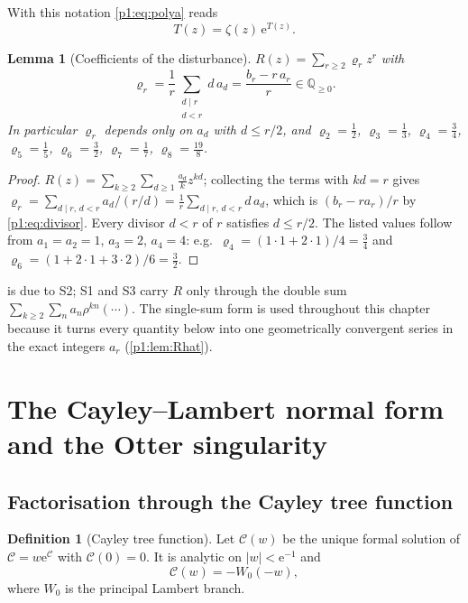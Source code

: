 \documentclass[11pt,a4paper,oneside]{book}
\theoremstyle{plain}
\newtheorem{lemma}[theorem]{Lemma}
\theoremstyle{definition}
\newtheorem{definition}[theorem]{Definition}
\theoremstyle{remark}
\newcommand{\Rat}{\mathbb{Q}}
\newcommand{\e}{\mathrm{e}}
\newcommand{\Wlam}{W}
\begin{document}
With this notation \cref{p1:eq:polya} reads
\begin{equation}
 T(z)=\zeta(z)\,\e^{T(z)} .
 \label{p1:eq:T-zeta}
\end{equation}

\begin{lemma}[Coefficients of the disturbance]
\label{p1:lem:R-coefficients}
$R(z)=\sum_{r\ge2}\varrho_rz^r$ with
\begin{equation}
 \varrho_r=\frac1r\sum_{\substack{d\mid r\\ d<r}}d\,a_d
 =\frac{b_r-r\,a_r}{r}\in\Rat_{\ge0}.
 \label{p1:eq:varrho}
\end{equation}
In particular $\varrho_r$ depends only on $a_d$ with $d\le r/2$, and $\varrho_2=\tfrac12$,
$\varrho_3=\tfrac13$, $\varrho_4=\tfrac34$, $\varrho_5=\tfrac15$, $\varrho_6=\tfrac32$,
$\varrho_7=\tfrac17$, $\varrho_8=\tfrac{19}{8}$.
\end{lemma}

\begin{proof}
$R(z)=\sum_{k\ge2}\sum_{d\ge1}\frac{a_d}{k}z^{kd}$; collecting the terms with $kd=r$ gives
$\varrho_r=\sum_{d\mid r,\,d<r}a_d/(r/d)=\frac1r\sum_{d\mid r,\,d<r}d\,a_d$, which is
$\left(b_r-ra_r\right)/r$ by \cref{p1:eq:divisor}. Every divisor $d<r$ of $r$ satisfies $d\le
r/2$.  The listed values follow from $a_1=a_2=1$, $a_3=2$, $a_4=4$: e.g.\
$\varrho_4=(1\cdot1+2\cdot1)/4=\tfrac34$ and $\varrho_6=(1+2\cdot1+3\cdot2)/6=\tfrac32$.
\end{proof}

 is due to \textsf{S2}; \textsf{S1} and \textsf{S3} carry $R$ only
through the double sum $\sum_{k\ge2}\sum_na_n\rho^{kn}(\cdots)$. The single-sum form is used
throughout this chapter because it turns every quantity below into one geometrically
convergent series in the exact integers $a_r$ (\cref{p1:lem:Rhat}).

\section{The Cayley--Lambert normal form and the Otter singularity}
\label{p1:sec:dominant}

\subsection{Factorisation through the Cayley tree function}

\begin{definition}[Cayley tree function]
\label{p1:def:cayley}
Let $\mathcal C(w)$ be the unique formal solution of $\mathcal C=w\e^{\mathcal C}$ with
$\mathcal C(0)=0$.  It is analytic on $|w|<\e^{-1}$ and
\begin{equation}
 \mathcal C(w)=-\Wlam_0(-w),
 \label{p1:eq:cayley-lambert}
\end{equation}
where $\Wlam_0$ is the principal Lambert branch.
\end{definition}
\end{document}
